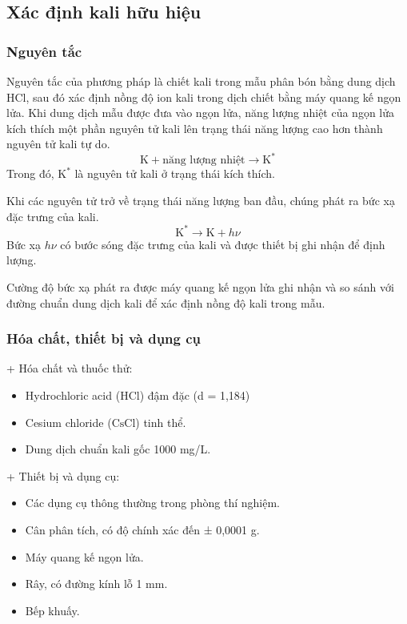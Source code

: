 \subsection{Xác định kali hữu hiệu}
\subsubsection{Nguyên tắc}
Nguyên tắc của phương pháp là chiết kali trong mẫu phân bón bằng dung dịch \(\mathrm{HCl}\), sau đó xác định nồng độ ion kali trong dịch chiết bằng máy quang kế ngọn lửa.
Khi dung dịch mẫu được đưa vào ngọn lửa, năng lượng nhiệt của ngọn lửa kích thích một phần nguyên tử kali lên trạng thái năng lượng cao hơn thành nguyên tử kali tự do.
\[
  \mathrm{K} + \text{năng lượng nhiệt} \longrightarrow \mathrm{K}^{*}
\]
Trong đó, $\mathrm{K}^{*}$ là nguyên tử kali ở trạng thái kích thích.

Khi các nguyên tử trở về trạng thái năng lượng ban đầu, chúng phát ra bức xạ đặc trưng của kali. 
\[
  \mathrm{K}^{*} \longrightarrow \mathrm{K} + h\nu
\]
Bức xạ $h\nu$ có bước sóng đặc trưng của kali và được thiết bị ghi nhận để định lượng.

Cường độ bức xạ phát ra được máy quang kế ngọn lửa ghi nhận và so sánh với đường chuẩn dung dịch kali để xác định nồng độ kali trong mẫu.

\subsubsection{Hóa chất, thiết bị và dụng cụ}
+ Hóa chất và thuốc thử:
\begin{itemize}
  \item Hydrochloric acid (\(\mathrm{HCl}\)) đậm đặc (d = 1,184)
  \item Cesium chloride (\(\mathrm{CsCl}\)) tinh thể.
  \item Dung dịch chuẩn kali gốc 1000 mg/L.
\end{itemize}

+ Thiết bị và dụng cụ:
\begin{itemize}
  \item Các dụng cụ thông thường trong phòng thí nghiệm.
  \item Cân phân tích, có độ chính xác đến ± 0,0001 g.
  \item Máy quang kế ngọn lửa.
  \item Rây, có đường kính lỗ 1 mm.
  \item Bếp khuấy.
\end{itemize}


